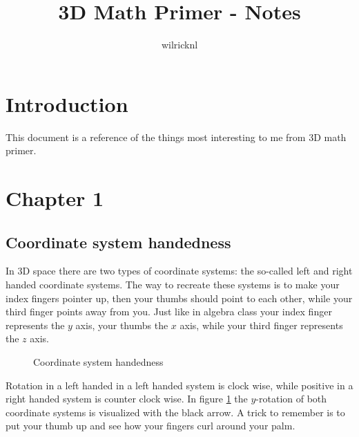 \documentclass[11pt]{article}
\author{wilricknl}
\title{3D Math Primer - Notes}
\begin{document}
\maketitle

\section{Introduction}

This document is a reference of the things most interesting to me from 3D math primer.

\section{Chapter 1}

\subsection{Coordinate system handedness}

In 3D space there are two types of coordinate systems: the so-called left and right handed coordinate systems. The way to recreate these systems is to make your index fingers pointer up, then your thumbs should point to each other, while your third finger points away from you. Just like in algebra class your index finger represents the $y$ axis, your thumbs the $x$ axis, while your third finger represents the $z$ axis.

\begin{figure}[H]
\centering
\caption{Coordinate system handedness}
\label{fig:coordinate-system-handedness}
\end{figure}

Rotation in a left handed in a left handed system is clock wise, while positive in a right handed system is counter clock wise. In figure  \ref{fig:coordinate-system-handedness} the $y$-rotation of both  coordinate systems is visualized with the black arrow. A trick to remember is to put your thumb up and see how your fingers curl around your palm.
\end{document}
